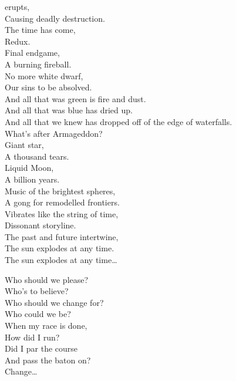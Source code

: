  erupts, \\
Causing deadly destruction. \\
The time has come, \\
Redux. \\
Final endgame, \\
A burning fireball. \\
No more white dwarf, \\
Our sins to be absolved. \\

And all that was green is fire and dust. \\
And all that was blue has dried up. \\
And all that we knew has dropped off of the edge of waterfalls. \\
What's after Armageddon? \\

Giant star, \\
A thousand tears. \\
Liquid Moon, \\
A billion years. \\
Music of the brightest spheres, \\
A gong for remodelled frontiers. \\
Vibrates like the string of time, \\
Dissonant storyline. \\
The past and future intertwine, \\
The sun explodes at any time. \\

The sun explodes at any time… \\





Who should we please? \\
Who's to believe? \\
Who should we change for? \\
Who could we be? \\
When my race is done, \\
How did I run? \\
Did I par the course \\
And pass the baton on? \\

Change… \\

